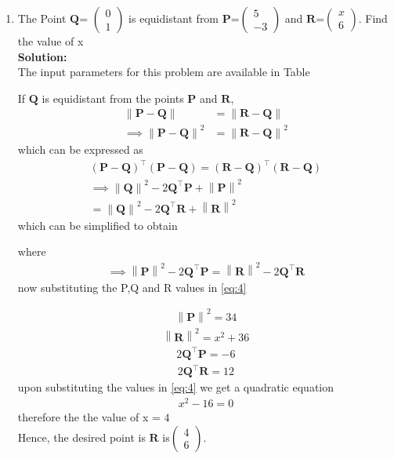 \documentclass[12pt]{article}
\providecommand{\brak}[1]{\ensuremath{\left(#1\right)}}
\providecommand{\norm}[1]{\left\lVert#1\right\rVert}
\newcommand{\solution}{\noindent \textbf{Solution: }}
\newcommand{\myvec}[1]{\ensuremath{\begin{pmatrix}#1\end{pmatrix}}}
\let\vec\mathbf
\begin{document}
\begin{enumerate}

\item The Point $\vec{Q}$= $\myvec{0\\ 1}$  is equidistant from $\vec{P}$=$\myvec{5 \\ -3}$ and $\vec{R}$=$\myvec{x\\6}$. Find the value of x\\

\solution \\The input parameters for this problem are available in Table 
\begin{table}[ht!]

\caption{}
\label{Table-1}	
\end{table}


  If $\vec{Q}$  is  equidistant from the points $\vec{P}$ and $\vec{R}$, 
\begin{align}
 \norm{\vec{P}-\vec{Q}} &=
\norm{\vec{R}-\vec{Q}} 
\\
 \implies \norm{\vec{P}-\vec{Q}}^2 &=
\norm{\vec{R}-\vec{Q}}^2 
\end{align}
which can be expressed as 
\begin{multline}
 \brak{\vec{P}-\vec{Q}}^{\top} \brak{\vec{P}-\vec{Q}}=
 \brak{\vec{R}-\vec{Q}}^{\top} 
\brak{\vec{R}-\vec{Q}}
\\
 \implies \norm{\vec{Q}}^2-2{\vec{Q}}^{\top}\vec{P} + \norm{\vec{P}}^2
 \\= \norm{\vec{Q}}^2-2{\vec{Q}}^{\top}\vec{R} + \norm{\vec{R}}^2
\end{multline}
which can be simplified to obtain
  
  where 
  \begin{align}
   \implies \norm{\vec{P}}^2-2{\vec{Q}}^{\top}\vec{P} = \norm{\vec{R}}^2-2{\vec{Q}}^{\top}\vec{R} 
\label{eq:4} 
  \end{align}
  now substituting the P,Q and R values in \eqref{eq:4}

  \begin{align}
   \norm{\vec{P}}^2 = 34
    \end{align}
 \begin{align}
   \norm{\vec{R}}^2 = x^2+36
    \end{align}
  \begin{align}
 2{\vec{Q}}^{\top}\vec{P}= -6
\end{align}
\begin{align}
 2{\vec{Q}}^{\top}\vec{R}= 12
\end{align}
upon   substituting the values in \eqref{eq:4} we get a quadratic equation 
\begin{align}
x^2-16=0
\end{align}
therefore the the value of x = $4$
\\Hence, the desired point is $\vec{R}$ is$\myvec{ 4 \\ 6}$.



\end{enumerate}
\end{document}
